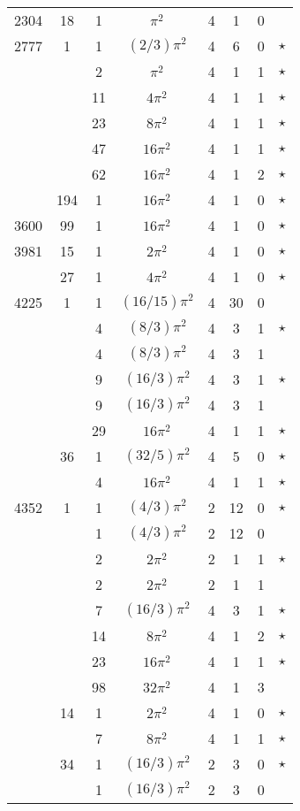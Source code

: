 \documentclass[12pt]{amsart}
\begin{document}
\begin{tabular}{ccc|ccccc}
2304 & 18 & 1 & $\pi^2$ & 4 & 1 & 0 &  \\
2777 & 1 & 1 & $(2/3)\pi^2$ & 4 & 6 & 0 & $\star$ \\
 &  & 2 & $\pi^2$ & 4 & 1 & 1 & $\star$ \\
 &  & 11 & $4\pi^2$ & 4 & 1 & 1 & $\star$ \\
 &  & 23 & $8\pi^2$ & 4 & 1 & 1 & $\star$ \\
 &  & 47 & $16\pi^2$ & 4 & 1 & 1 & $\star$ \\
 &  & 62 & $16\pi^2$ & 4 & 1 & 2 & $\star$ \\
 & 194 & 1 & $16\pi^2$ & 4 & 1 & 0 & $\star$ \\
3600 & 99 & 1 & $16\pi^2$ & 4 & 1 & 0 & $\star$ \\
3981 & 15 & 1 & $2\pi^2$ & 4 & 1 & 0 & $\star$ \\
 & 27 & 1 & $4\pi^2$ & 4 & 1 & 0 & $\star$ \\
4225 & 1 & 1 & $(16/15)\pi^2$ & 4 & 30 & 0 &  \\
 &  & 4 & $(8/3)\pi^2$ & 4 & 3 & 1 & $\star$ \\
 &  & 4 & $(8/3)\pi^2$ & 4 & 3 & 1 &  \\
 &  & 9 & $(16/3)\pi^2$ & 4 & 3 & 1 & $\star$ \\
 &  & 9 & $(16/3)\pi^2$ & 4 & 3 & 1 &  \\
 &  & 29 & $16\pi^2$ & 4 & 1 & 1 & $\star$ \\
 & 36 & 1 & $(32/5)\pi^2$ & 4 & 5 & 0 & $\star$ \\
 &  & 4 & $16\pi^2$ & 4 & 1 & 1 & $\star$ \\
4352 & 1 & 1 & $(4/3)\pi^2$ & 2 & 12 & 0 & $\star$ \\
 &  & 1 & $(4/3)\pi^2$ & 2 & 12 & 0 &  \\
 &  & 2 & $2\pi^2$ & 2 & 1 & 1 & $\star$ \\
 &  & 2 & $2\pi^2$ & 2 & 1 & 1 &  \\
 &  & 7 & $(16/3)\pi^2$ & 4 & 3 & 1 & $\star$ \\
 &  & 14 & $8\pi^2$ & 4 & 1 & 2 & $\star$ \\
 &  & 23 & $16\pi^2$ & 4 & 1 & 1 & $\star$ \\
 &  & 98 & $32\pi^2$ & 4 & 1 & 3 &  \\
 & 14 & 1 & $2\pi^2$ & 4 & 1 & 0 & $\star$ \\
 &  & 7 & $8\pi^2$ & 4 & 1 & 1 & $\star$ \\
 & 34 & 1 & $(16/3)\pi^2$ & 2 & 3 & 0 & $\star$ \\
 &  & 1 & $(16/3)\pi^2$ & 2 & 3 & 0 &  \\

\end{tabular}
\end{document}

